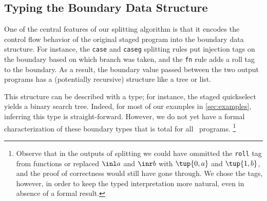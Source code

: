 \begin{abstrsyn}
\subsection{Typing the Boundary Data Structure}

One of the central features of our splitting algorithm is that
it encodes the control flow behavior of the original 
staged program into the boundary data structure.
For instance, the {\tt case} and {\tt caseg} splitting rules 
put injection tags on the boundary based on which branch was taken,
and the {\tt fn} rule adds a roll tag to the boundary.
As a result, the boundary value passed between the two output programs has a (potentially recursive) structure like a tree or list.

This structure can be described with a type; for instance, the staged quickselect yields a binary search tree.
Indeed, for most of our examples in \ref{sec:examples}, inferring this type is straight-forward. 
However, we do not yet have a formal characterization of these boundary types that is total for all \lang\ programs.
\footnote{Observe that in the outputs of splitting we could have ommitted the {\tt roll} tag from functions or 
replaced $\inl a$ and $\inr b$ with $\tup {0,a}$ and $\tup {1,b}$, and the proof of correctness would still have gone through.
We chose the tags, however, in order to keep the typed interpretation more natural, even in absence of a formal result.
}
\end{abstrsyn}




